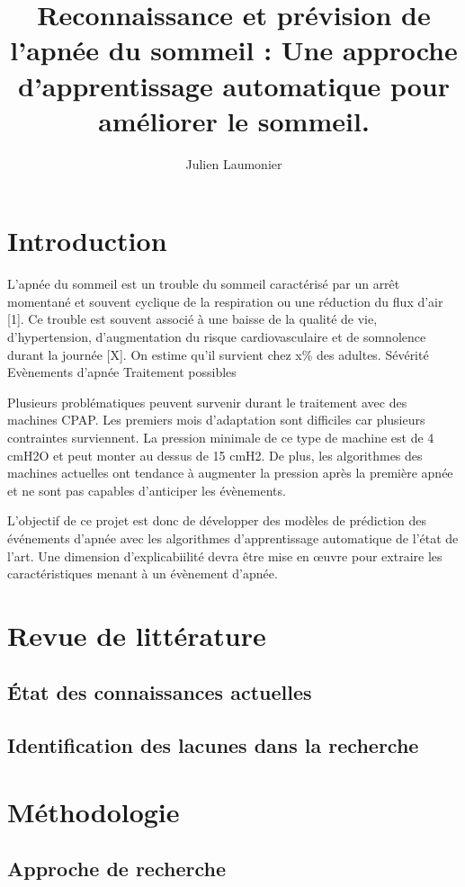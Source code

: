 \documentclass{article}
\title{Reconnaissance et prévision de l'apnée du sommeil : Une approche d'apprentissage automatique pour améliorer le sommeil. }
\author{Julien Laumonier}
\begin{document}
    \maketitle

    \section{Introduction}

    L’apnée du sommeil est un trouble du sommeil caractérisé par un arrêt momentané et souvent cyclique de la respiration ou une réduction du flux d’air [1]. Ce trouble est souvent associé à une baisse de la qualité de vie, d'hypertension, d’augmentation du risque cardiovasculaire et de somnolence durant la journée [X]. On estime qu’il survient chez x\% des adultes.
    Sévérité
    Evènements d’apnée
    Traitement possibles

    Plusieurs problématiques peuvent survenir durant le traitement avec des machines CPAP. Les premiers mois d’adaptation sont difficiles car plusieurs contraintes surviennent. La pression minimale de ce type de machine est de 4 cmH2O et peut monter au dessus de 15 cmH2. De plus, les algorithmes des machines actuelles ont tendance à augmenter la pression après la première apnée et ne sont pas capables d’anticiper les évènements.

    L’objectif de ce projet est donc de développer des modèles de prédiction des événements d’apnée avec les algorithmes d’apprentissage automatique de l’état de l’art. Une dimension d’explicabiilité devra être mise en œuvre pour extraire les caractéristiques menant à un évènement d’apnée.

    \section{Revue de littérature}
    \subsection{État des connaissances actuelles}
    \subsection{Identification des lacunes dans la recherche}

    \section{ Méthodologie}
    \subsection{Approche de recherche}
\end{document}
